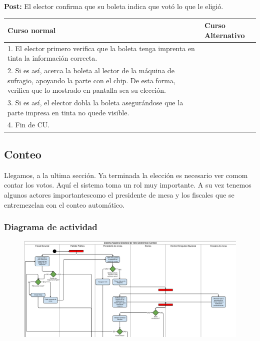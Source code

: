 \textbf{Post:} El elector confirma que su boleta indica que votó lo que le eligió.

\begin{table}[h!]
	
 \begin{tabular}{|p{7.5cm} | p{7.5cm}|} 
 \hline
 \textbf{Curso normal} & \textbf{Curso Alternativo} \\
 \hline
 1. El elector primero verifica que la boleta tenga imprenta en tinta la información correcta. & \\
\hline

2. Si es así, acerca la boleta al lector de la máquina de sufragio, apoyando la parte con el chip. De esta forma, verifica que lo mostrado en pantalla sea su elección. & \\
\hline

3. Si es así, el elector dobla la boleta asegurándose que la parte impresa en tinta no quede visible. & \\
\hline

4. Fin de CU. & \\
\hline
\end{tabular}
\end{table}

\subsection{Conteo}

Llegamos, a la ultima sección. Ya terminada la elección es necesario ver comom contar los votos. Aquí el sistema toma un rol muy importante. A su vez tenemos algunos actores importantescomo el presidente de mesa y los fiscales que se entremezclan con el conteo automático.

\subsubsection{Diagrama de actividad}
\begin{figure}[h!]
\centering
\includegraphics[scale=0.5]{imagenes/actividad/actividadConteo1}
\end{figure}			

